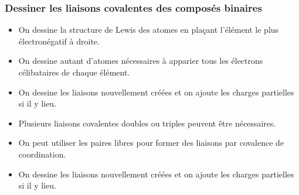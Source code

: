 \documentclass[
  11pt,
  a4paper,
  openany]{book}
\providecommand{\tightlist}{%
  \setlength{\itemsep}{0pt}\setlength{\parskip}{0pt}}
\begin{document}
\hypertarget{dessiner-les-liaisons-covalentes-des-composuxe9s-binaires}{%
\subsubsection{Dessiner les liaisons covalentes des composés binaires}\label{dessiner-les-liaisons-covalentes-des-composuxe9s-binaires}}

\begin{itemize}
\tightlist
\item
  On dessine la structure de Lewis des atomes en plaçant l'élément le plus électronégatif à droite.
\item
  On dessine autant d'atomes nécessaires à apparier tous les électrons célibataires de chaque élément.
\item
  On dessine les liaisons nouvellement créées et on ajoute les charges partielles si il y lieu.
\item
  Plusieurs liaisons covalentes doubles ou triples peuvent être nécessaires.
\item
  On peut utiliser les paires libres pour former des liaisons par covalence de coordination.
\item
  On dessine les liaisons nouvellement créées et on ajoute les charges partielles si il y lieu.
\end{itemize}
\end{document}
